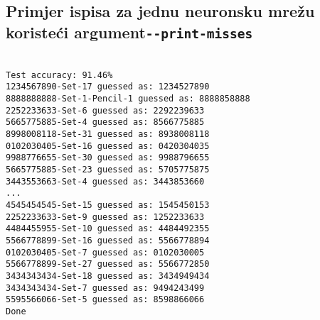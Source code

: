 \texttt{}
\normalsize

\subsection*{Primjer ispisa za jednu neuronsku mrežu koristeći argument\newline\texttt{-{}-print-misses}}
\scriptsize
\texttt{
\\
Test accuracy: 91.46\%\\
1234567890-Set-17 guessed as: 1234527890\\
8888888888-Set-1-Pencil-1 guessed as: 8888858888\\
2252233633-Set-6 guessed as: 2292239633\\
5665775885-Set-4 guessed as: 8566775885\\
8998008118-Set-31 guessed as: 8938008118\\
0102030405-Set-16 guessed as: 0420304035\\
9988776655-Set-30 guessed as: 9988796655\\
5665775885-Set-23 guessed as: 5705775875\\
3443553663-Set-4 guessed as: 3443853660\\
...\\
4545454545-Set-15 guessed as: 1545450153\\
2252233633-Set-9 guessed as: 1252233633\\
4484455955-Set-10 guessed as: 4484492355\\
5566778899-Set-16 guessed as: 5566778894\\
0102030405-Set-7 guessed as: 0102030005\\
5566778899-Set-27 guessed as: 5566772850\\
3434343434-Set-18 guessed as: 3434949434\\
3434343434-Set-7 guessed as: 9494243499\\
5595566066-Set-5 guessed as: 8598866066\\
Done\\
}

\texttt{}
\normalsize
